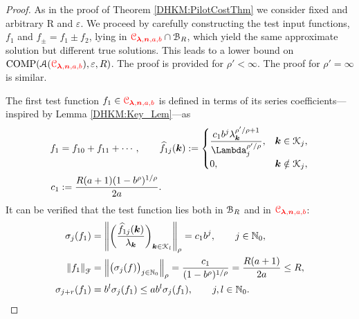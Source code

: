 \documentclass[USenglish]{article}
\theoremstyle{dgthm}
\theoremstyle{dgthm}
\theoremstyle{dgthm}
\theoremstyle{dgthm}
\theoremstyle{dgdef}
\theoremstyle{definition}
\DeclareMathOperator{\COMP}{COMP}
\newcommand{\hf}{\widehat{f}}
\newcommand{\norm}[2][{}]{\ensuremath{\left \lVert #2 \right \rVert}_{#1}}
\newcommand{\DHKMchange}[1]{{\color{red}{#1}}}
\begin{document}
\begin{proof}

As in the proof of Theorem \ref{DHKM:PilotCostThm} we consider fixed and arbitrary R and $\varepsilon$.
We proceed by carefully constructing the test input functions, $f_1$ and $f_{\pm} = f_1 \pm f_2$, lying in $\DHKMchange{\calC_{\boldsymbol{\lambda},\bsn,a,b}}\cap \calB_{R}$, which yield the same approximate solution but different true solutions.  This leads to a lower bound on $\COMP(\calA(\DHKMchange{\calC_{\boldsymbol{\lambda},\bsn,a,b}}),\varepsilon,R)$. The proof is provided for $\rho' < \infty$.  The proof for $\rho' = \infty$ is similar.

The first test function $f_1 \in \DHKMchange{\calC_{\boldsymbol{\lambda},\bsn,a,b}}$ is defined in terms of its series coefficients---inspired by Lemma \ref{DHKM:Key_Lem}---as
\begin{align}
\nonumber
f_1 &= f_{10} + f_{11} +  \cdots, \qquad
\hf_{1j}(\bsk) := \begin{cases}
\displaystyle
\frac{c_1 b^{j} \lambda_{\bsk}^{\rho'/\rho+1}}{\Lambda_j^{\rho'/\rho}},  & \bsk \in \calK_j,
\\
0, & \bsk \notin \calK_j,
\end{cases}
\\
\nonumber
c_1 &:=  \frac{R(a+1)(1 - b^\rho)^{1/\rho}}{2a}.
\end{align}
It can be verified that the test function lies both in ${\mathcal{B}}_{R}$ and in $\DHKMchange{\calC_{\boldsymbol{\lambda},\bsn,a,b}}$:
\begin{align}
\nonumber
\sigma_j(f_1) & = \norm[\rho]{\biggl(\frac{\hf_{1j}(\bsk)}{\lambda_{\bsk}} \biggr)_{\bsk \in \calK_l}} 
= c_1 b^j, \qquad j \in \N_0,\\
\nonumber
\norm[\calF]{f_1} &= \norm[\rho]{\bigl( \sigma_j(f) \bigr)_{j \in \N_0} } 
=  \frac{c_1}{(1 - b^\rho)^{1/\rho}} = \frac{R(a+1)}{2a} \le R,
\\
\nonumber
\sigma_{j+r}(f_1) &= 
b^{l} \sigma_j(f_1) \le a b^l \sigma_j(f_1), \qquad j,l \in \N_0.
\end{align}


\end{proof}
\end{document}
